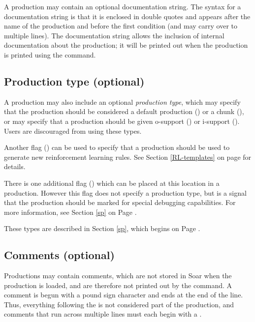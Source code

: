 A production may contain an optional documentation string. The syntax for a documentation string is that it is enclosed in double quotes and appears after the name of the production and before the first condition (and may carry over to multiple lines). The documentation string allows the inclusion of internal documentation about the production; it will be printed out when the production is printed using the  command.

\subsection{Production type (optional)}

A production may also include an optional \emph{production type}, which may specify that the production should be considered a default production () or a chunk (), or may specify that a production should be given o-support () or i-support ().  Users are discouraged from using these types.  

Another flag () can be used to specify that a production should be used to generate new reinforcement learning rules. See Section \ref{RL-templates} on page \pageref{RL-templates} for details.

There is one additional flag () which can be placed at this location in a production. However this flag does not specify a production type, but is a signal that the production should be marked for special debugging capabilities. For more information, see Section \ref{sp} on Page \pageref{sp}.

These types are described in Section \ref{sp}, which begins on Page \pageref{sp}.

\subsection{Comments (optional)}

Productions may contain comments, which are not stored in Soar when the production is loaded, and are therefore not printed out by the  command. A comment is begun with a pound sign character \soar{\#} and ends at the end of the line.  Thus, everything following the \soar{\#} is not considered part of the production, and comments that run across multiple lines must each begin with a \soar{\#}.

